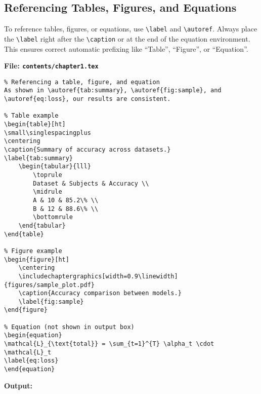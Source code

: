 \documentclass{VISTEC}
\begin{document}
\subsection{Referencing Tables, Figures, and Equations}
\label{manual:ref-table-figure}

\begin{subparagraph}
To reference tables, figures, or equations, use \verb|\label| and \verb|\autoref|. Always place the \verb|\label| right after the \verb|\caption| or at the end of the equation environment. This ensures correct automatic prefixing like ``Table'', ``Figure'', or ``Equation''.
\end{subparagraph}

\noindent\textbf{File: \texttt{contents/chapter1.tex}}\vspace{-1.5em}
\begin{verbatim}
% Referencing a table, figure, and equation
As shown in \autoref{tab:summary}, \autoref{fig:sample}, and \autoref{eq:loss}, our results are consistent.

% Table example
\begin{table}[ht]
\small\singlespacingplus
\centering
\caption{Summary of accuracy across datasets.}
\label{tab:summary}
    \begin{tabular}{lll}
        \toprule
        Dataset & Subjects & Accuracy \\
        \midrule
        A & 10 & 85.2\% \\
        B & 12 & 88.6\% \\
        \bottomrule
    \end{tabular}
\end{table}

% Figure example
\begin{figure}[ht]
    \centering
    \includechaptergraphics[width=0.9\linewidth]{figures/sample_plot.pdf}
    \caption{Accuracy comparison between models.}
    \label{fig:sample}
\end{figure}

% Equation (not shown in output box)
\begin{equation}
\mathcal{L}_{\text{total}} = \sum_{t=1}^{T} \alpha_t \cdot \mathcal{L}_t
\label{eq:loss}
\end{equation}
\end{verbatim}

\textbf{Output:}\vspace{0.5em}
\end{document}
